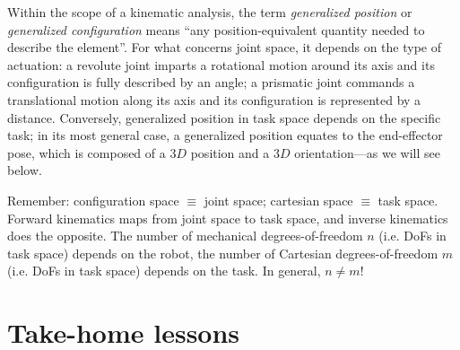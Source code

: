 Within the scope of a kinematic analysis, the term \textsl{generalized position} or \textsl{generalized configuration} means ``any position-equivalent quantity needed to describe the element''.
For what concerns joint space, it depends on the type of actuation: a revolute joint imparts a rotational motion around its axis and its configuration is fully described by an angle; a prismatic joint commands a translational motion along its axis and its configuration is represented by a distance.
Conversely, generalized position in task space depends on the specific task; in its most general case, a generalized position equates to the end-effector pose, which is composed of a $3D$ position and a $3D$ orientation---as we will see below.

\begin{mdframed}
\noindent Remember:
configuration space $\equiv$ joint space;
cartesian space $\equiv$ task space.
Forward kinematics maps from joint space to task space, and inverse kinematics does the opposite.
The number of mechanical degrees-of-freedom $n$ (i.e. DoFs in task space) depends on the robot, the number of Cartesian degrees-of-freedom $m$ (i.e. DoFs in task space) depends on the task. In general, $n \neq m$!
\end{mdframed}







\section*{Take-home lessons}

